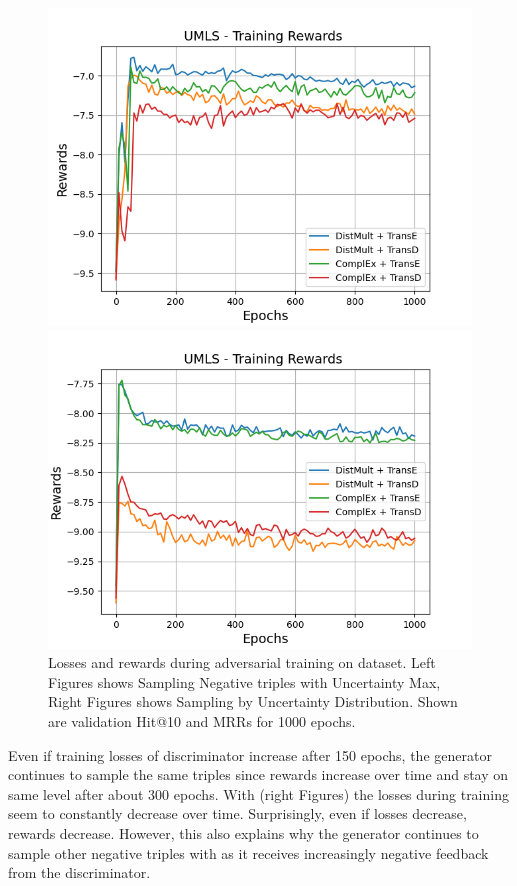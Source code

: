 \begin{figure}[H]
\begin{minipage}{.5\textwidth}
      \includegraphics[width=0.9\linewidth]{figures/results/gan_train/not_pretrained/uncertainty/max/entropy/umls/1k_epochs/uncertainty_umls_rew.png}
    \end{minipage}%
    \begin{minipage}{.5\textwidth}
      \centering
      \includegraphics[width=0.9\linewidth]{figures/results/gan_train/not_pretrained/uncertainty/max_distribution/entropy/umls/1k_epochs/uncertainty_umls_rew.png}
    \end{minipage}%
    \caption{Losses and rewards during adversarial training on \umls dataset. 
    Left Figures shows Sampling Negative triples with Uncertainty Max, Right Figures shows Sampling by Uncertainty Distribution.
    Shown are validation Hit@10 and MRRs for 1000 epochs.}
    \label{fig:advtrain_umls_usmax_ussoftmax_losses_rewards}
\end{figure}
Even if training losses of discriminator increase after 150 epochs, the generator continues to sample the same triples since rewards increase over time and stay on same level after about 300 epochs.
With \ussoftmax (right Figures) the losses during training seem to constantly decrease over time.
Surprisingly, even if losses decrease, rewards decrease.
However, this also explains why the generator continues to sample other negative triples with \ussoftmax as it receives increasingly negative feedback from the discriminator.

